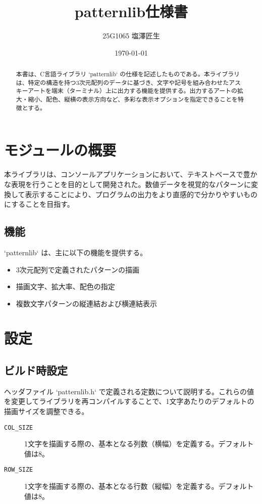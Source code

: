 \documentclass[uplatex]{jsarticle}
\begin{document}
\title{patternlib仕様書}
\author{25G1065 塩澤匠生}

\date{\today}
\maketitle

\begin{abstract}
本書は、C言語ライブラリ `patternlib` の仕様を記述したものである。本ライブラリは、特定の構造を持つ3次元配列のデータに基づき、文字や記号を組み合わせたアスキーアートを端末（ターミナル）上に出力する機能を提供する。出力するアートの拡大・縮小、配色、縦横の表示方向など、多彩な表示オプションを指定できることを特徴とする。
\end{abstract}

\tableofcontents
\clearpage

\section{モジュールの概要}
本ライブラリは、コンソールアプリケーションにおいて、テキストベースで豊かな表現を行うことを目的として開発された。数値データを視覚的なパターンに変換して表示することにより、プログラムの出力をより直感的で分かりやすいものにすることを目指す。

\subsection{機能}
`patternlib` は、主に以下の機能を提供する。
\begin{itemize}
    \item 3次元配列で定義されたパターンの描画
    \item 描画文字、拡大率、配色の指定
    \item 複数文字パターンの縦連結および横連結表示
\end{itemize}

\section{設定}
\subsection{ビルド時設定}
ヘッダファイル `patternlib.h` で定義される定数について説明する。これらの値を変更してライブラリを再コンパイルすることで、1文字あたりのデフォルトの描画サイズを調整できる。

\begin{description}
    \item[\texttt{COL\_SIZE}] 1文字を描画する際の、基本となる列数（横幅）を定義する。デフォルト値は8。
    \item[\texttt{ROW\_SIZE}] 1文字を描画する際の、基本となる行数（縦幅）を定義する。デフォルト値は8。
\end{description}
\end{document}
